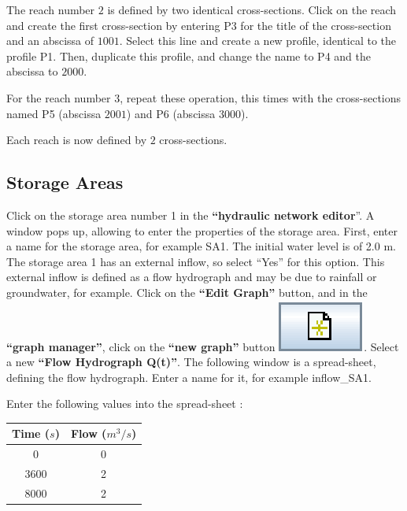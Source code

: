 \documentclass[a4paper,12pt]{article}
\begin{document}
The reach number $2$ is defined by two identical cross-sections. Click
on the reach and create the first cross-section by entering P3 for
the title of the cross-section and an abscissa of $1001$. Select this
line and create a new profile, identical to the profile P1. Then,
duplicate this profile, and change the name to P4 and the abscissa
to $2000$. 

\vspace{0.5cm}

For the reach number $3$, repeat these operation, this times with the
cross-sections named P5 (abscissa $2001$) and P6 (abscissa $3000$).

\vspace{0.5cm}

Each reach is now defined by $2$ cross-sections.


\subsection{Storage Areas  }

\hspace{0.5cm}Click on the storage area number 1 in the \textbf{{}``hydraulic network
editor}''. A window pops up, allowing to enter the properties
of the storage area. First, enter a name for the storage area, for
example SA1. The initial water level is of 2.0 m. The storage area
1 has an external inflow, so select {}``Yes'' for this option. This
external inflow is defined as a flow hydrograph and may be due to
rainfall or groundwater, for example. Click on the \textbf{{}``Edit
Graph''} button, and in the \textbf{{}``graph manager''}, click
on the \textbf{{}``new graph''} button \includegraphics[scale=0.6]{new}.
Select a new\textbf{ {}``Flow Hydrograph Q(t)''}. The following
window is a spread-sheet, defining the flow hydrograph. Enter a name
for it, for example inflow\_SA1. 

\vspace{0.5cm}

Enter the following values into the spread-sheet : 

\begin{table}[h]
\begin{center}

\begin{tabular}{|c|c|}
\hline 
Time ($s$) & Flow ($m^3/s$)\tabularnewline
\hline 
\hline 
0 & 0\tabularnewline
\hline 
3600 & 2\tabularnewline
\hline 
8000 & 2\tabularnewline
\hline 
\end{tabular}
\end{center}
\end{table}
\end{document}
